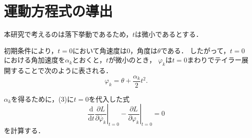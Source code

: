 \documentclass[11pt, a4paper]{ltjsarticle}
\begin{document}
\section{運動方程式の導出}
本研究で考えるのは落下挙動であるため，$t$は微小であるとする．

初期条件により，$t = 0$において角速度は$0$，角度は$\theta$である．
したがって，$t = 0$における角加速度を$\alpha_k$とおくと，$t$が微小のとき，
$\varphi_k$は$t = 0$まわりでテイラー展開することで次のように表される．
\begin{equation}
  \varphi_k = \theta + \frac{\alpha_k}{2}t^2.
\end{equation}

$\alpha_k$を得るために，(3)に$t = 0$を代入した式
\begin{equation}
  \left.\frac{\mathrm{d}}{\mathrm{d}t} \frac{\partial L}{\partial \dot{\varphi_k}}\right|_{t = 0}
  - \left.\frac{\partial L}{\partial \varphi_k}\right|_{t = 0} = 0
\end{equation}
を計算する．
\end{document}
